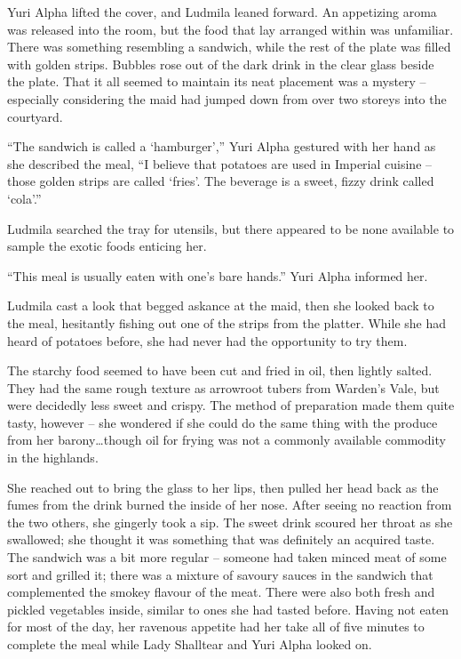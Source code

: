Yuri Alpha lifted the cover, and Ludmila leaned forward. An appetizing aroma was released into the room, but the food that lay arranged within was unfamiliar. There was something resembling a sandwich, while the rest of the plate was filled with golden strips. Bubbles rose out of the dark drink in the clear glass beside the plate. That it all seemed to maintain its neat placement was a mystery – especially considering the maid had jumped down from over two storeys into the courtyard.

 

“The sandwich is called a ‘hamburger’,” Yuri Alpha gestured with her hand as she described the meal, “I believe that potatoes are used in Imperial cuisine – those golden strips are called ‘fries’. The beverage is a sweet, fizzy drink called ‘cola’.”

 

Ludmila searched the tray for utensils, but there appeared to be none available to sample the exotic foods enticing her.

 

“This meal is usually eaten with one’s bare hands.” Yuri Alpha informed her.

 

Ludmila cast a look that begged askance at the maid, then she looked back to the meal, hesitantly fishing out one of the strips from the platter. While she had heard of potatoes before, she had never had the opportunity to try them.

 

The starchy food seemed to have been cut and fried in oil, then lightly salted. They had the same rough texture as arrowroot tubers from Warden’s Vale, but were decidedly less sweet and crispy. The method of preparation made them quite tasty, however – she wondered if she could do the same thing with the produce from her barony…though oil for frying was not a commonly available commodity in the highlands.

 

She reached out to bring the glass to her lips, then pulled her head back as the fumes from the drink burned the inside of her nose. After seeing no reaction from the two others, she gingerly took a sip. The sweet drink scoured her throat as she swallowed; she thought it was something that was definitely an acquired taste. The sandwich was a bit more regular – someone had taken minced meat of some sort and grilled it; there was a mixture of savoury sauces in the sandwich that complemented the smokey flavour of the meat. There were also both fresh and pickled vegetables inside, similar to ones she had tasted before. Having not eaten for most of the day, her ravenous appetite had her take all of five minutes to complete the meal while Lady Shalltear and Yuri Alpha looked on.

